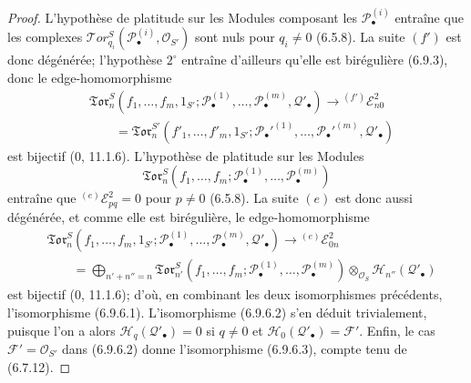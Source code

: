 \begin{proof}
L'hypothèse de platitude sur les Modules composant les
$\mathscr P_\bullet^{(i)}$ entraîne que les complexes
$\mathscr{T}\!or_{q_i}^S(\mathscr P_\bullet^{(i)},\mathscr O_{S'})$ sont nuls
pour $q_i\ne0$ (6.5.8). La suite $(f')$ est donc dégénérée; l'hypothèse
$2^\circ$ entraîne d'ailleurs qu'elle est birégulière (6.9.3), donc le
edge-homomorphisme
\[
\begin{split}
  &\mathfrak{Tor}_n^S
  (f_1,\ldots,f_m,1_{S'};
   \mathscr P_\bullet^{(1)},\ldots,
   \mathscr P_\bullet^{(m)},\mathscr Q'_\bullet)
  \longrightarrow {}^{(f')}\mathscr E_{n0}^2\\
  &\qquad=
  \mathfrak{Tor}_n^{S'}
  (f'_1,\ldots,f'_m,1_{S'};
   \mathscr P_\bullet'^{(1)},\ldots,
   \mathscr P_\bullet'^{(m)},\mathscr Q'_\bullet)
\end{split}
\tag{6.9.6.4}\label{III.6.9.6.4.fr}
\]
est bijectif (0, 11.1.6). L'hypothèse de platitude sur les Modules
\[
  \mathfrak{Tor}_n^S
  (f_1,\ldots,f_m;
   \mathscr P_\bullet^{(1)},\ldots,\mathscr P_\bullet^{(m)})
\]
entraîne que ${}^{(e)}\mathscr E_{pq}^2=0$ pour $p\ne0$ (6.5.8). La suite
$(e)$ est donc aussi dégénérée, et comme elle est birégulière, le
edge-homomorphisme
\[
\begin{split}
  &\mathfrak{Tor}_n^S
  (f_1,\ldots,f_m,1_{S'};
   \mathscr P_\bullet^{(1)},\ldots,
   \mathscr P_\bullet^{(m)},\mathscr Q'_\bullet)
  \longrightarrow {}^{(e)}\mathscr E_{0n}^2\\
  &\qquad=
  \bigoplus_{n'+n''=n}
  \mathfrak{Tor}_{n'}^S
  (f_1,\ldots,f_m;
   \mathscr P_\bullet^{(1)},\ldots,
   \mathscr P_\bullet^{(m)})
  \otimes_{\mathscr O_S}\mathscr H_{n''}(\mathscr Q'_\bullet)
\end{split}
\tag{6.9.6.5}\label{III.6.9.6.5.fr}
\]
est bijectif (0, 11.1.6); d'où, en combinant les deux isomorphismes
précédents, l'isomorphisme (6.9.6.1). L'isomorphisme (6.9.6.2) s'en déduit
trivialement, puisque l'on a alors
$\mathscr H_q(\mathscr Q'_\bullet)=0$ si $q\ne0$ et
$\mathscr H_0(\mathscr Q'_\bullet)=\mathscr F'$. Enfin, le cas
$\mathscr F'=\mathscr O_{S'}$ dans (6.9.6.2) donne l'isomorphisme (6.9.6.3),
compte tenu de (6.7.12).
\end{proof}

